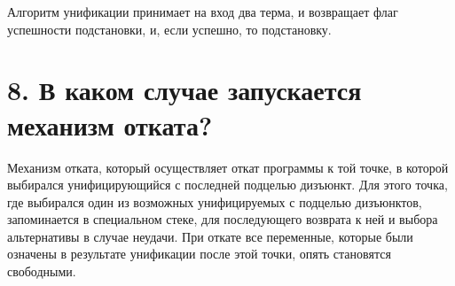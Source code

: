 Алгоритм унификации принимает на вход два терма, и возвращает флаг успешности подстановки, и, если успешно, то подстановку.

\section*{8. В каком случае запускается механизм отката?}
Механизм отката, который осуществляет откат программы к той точке, в которой выбирался унифицирующийся с последней подцелью дизъюнкт.
Для этого точка, где выбирался один из возможных унифицируемых с подцелью дизъюнктов, запоминается в специальном стеке, для последующего возврата к ней и выбора альтернативы в случае неудачи. При откате все переменные, которые были означены в результате унификации после этой точки, опять становятся свободными.